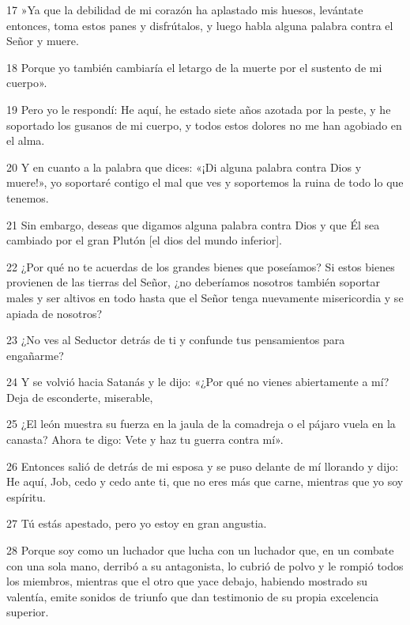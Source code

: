 \par 17 »Ya que la debilidad de mi corazón ha aplastado mis huesos, levántate entonces, toma estos panes y disfrútalos, y luego habla alguna palabra contra el Señor y muere.

\par 18 Porque yo también cambiaría el letargo de la muerte por el sustento de mi cuerpo».

\par 19 Pero yo le respondí: He aquí, he estado siete años azotada por la peste, y he soportado los gusanos de mi cuerpo, y todos estos dolores no me han agobiado en el alma.

\par 20 Y en cuanto a la palabra que dices: «¡Di alguna palabra contra Dios y muere!», yo soportaré contigo el mal que ves y soportemos la ruina de todo lo que tenemos.

\par 21 Sin embargo, deseas que digamos alguna palabra contra Dios y que Él sea cambiado por el gran Plutón [el dios del mundo inferior].

\par 22 ¿Por qué no te acuerdas de los grandes bienes que poseíamos? Si estos bienes provienen de las tierras del Señor, ¿no deberíamos nosotros también soportar males y ser altivos en todo hasta que el Señor tenga nuevamente misericordia y se apiada de nosotros?

\par 23 ¿No ves al Seductor detrás de ti y confunde tus pensamientos para engañarme?

\par 24 Y se volvió hacia Satanás y le dijo: «¿Por qué no vienes abiertamente a mí? Deja de esconderte, miserable,

\par 25 ¿El león muestra su fuerza en la jaula de la comadreja o el pájaro vuela en la canasta? Ahora te digo: Vete y haz tu guerra contra mí».

\par 26 Entonces salió de detrás de mi esposa y se puso delante de mí llorando y dijo: He aquí, Job, cedo y cedo ante ti, que no eres más que carne, mientras que yo soy espíritu.

\par 27 Tú estás apestado, pero yo estoy en gran angustia.

\par 28 Porque soy como un luchador que lucha con un luchador que, en un combate con una sola mano, derribó a su antagonista, lo cubrió de polvo y le rompió todos los miembros, mientras que el otro que yace debajo, habiendo mostrado su valentía, emite sonidos de triunfo que dan testimonio de su propia excelencia superior.

